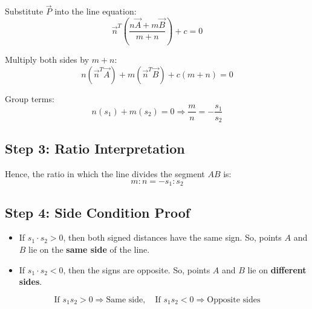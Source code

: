 \documentclass[journal]{IEEEtran}
\begin{document}
Substitute \( \vec{P} \) into the line equation:
\[
\vec{n}^T \left( \frac{n\vec{A} + m\vec{B}}{m+n} \right) + c = 0
\]

Multiply both sides by \( m+n \):
\[
n(\vec{n}^T \vec{A}) + m(\vec{n}^T \vec{B}) + c(m+n) = 0
\]

Group terms:
\[
n(s_1) + m(s_2) = 0
\Rightarrow \frac{m}{n} = -\frac{s_1}{s_2}
\]

\subsection*{Step 3: Ratio Interpretation}

Hence, the ratio in which the line divides the segment \( AB \) is:
\[
m:n = -s_1 : s_2
\]

\subsection*{Step 4: Side Condition Proof}

\begin{itemize}
    \item If \( s_1 \cdot s_2 > 0 \), then both signed distances have the same sign. So, points \( A \) and \( B \) lie on the \textbf{same side} of the line.
    \item If \( s_1 \cdot s_2 < 0 \), then the signs are opposite. So, points \( A \) and \( B \) lie on \textbf{different sides}.
\end{itemize}

\[
\boxed{
\text{If } s_1s_2 > 0 \Rightarrow \text{Same side}, \quad
\text{If } s_1s_2 < 0 \Rightarrow \text{Opposite sides}
}
\]
\end{document}
